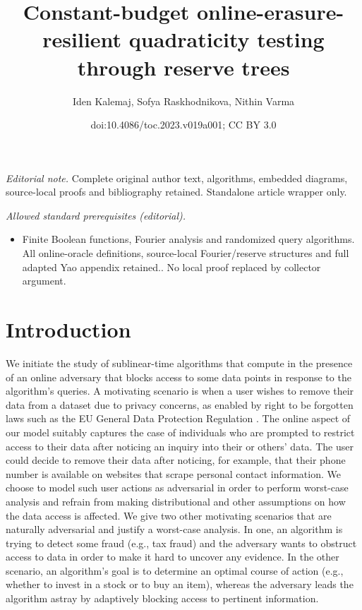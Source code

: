 \documentclass[11pt]{article}
\title{Constant-budget online-erasure-resilient quadraticity testing through reserve trees}
\author{Iden Kalemaj, Sofya Raskhodnikova, Nithin Varma}
\date{doi:10.4086/toc.2023.v019a001; CC BY 3.0}
\numberwithin{equation}{section}
\theoremstyle{definition}
\theoremstyle{plain}
\begin{document}
\maketitle
\noindent\textit{Editorial note.} Complete original author text, algorithms, embedded diagrams, source-local proofs and bibliography retained. Standalone article wrapper only.\par\medskip
\noindent\textit{Allowed standard prerequisites (editorial).}\begin{itemize}
\item Finite Boolean functions, Fourier analysis and randomized query algorithms. All online-oracle definitions, source-local Fourier/reserve structures and full adapted Yao appendix retained.. No local proof replaced by collector argument.
\end{itemize}\medskip
\section{Introduction}

	   
We initiate the study of sublinear-time algorithms that compute in the presence of an online adversary that blocks access to some data points in response to the algorithm's queries. A motivating scenario is when a user wishes to remove their data from a dataset due to privacy concerns, as enabled by right to be forgotten laws such as the EU General Data Protection Regulation \cite{Mantelero13}. 
The online aspect of our model suitably captures the case of individuals who are prompted to restrict access to their data after noticing an inquiry into their or others' data. The user could decide to remove their data after noticing, for example, that their phone number is available on websites that scrape personal contact information.
We choose to model such user actions as adversarial in order to perform worst-case analysis and refrain from making distributional and other assumptions on how the data access is affected. We give two other motivating scenarios that are naturally adversarial and justify a worst-case analysis. In one, an  algorithm is trying to detect some fraud (e.g., tax fraud) and the adversary wants to obstruct access to data in order to make it hard to uncover any evidence. In the other scenario, an algorithm's goal is to determine an optimal course of action (e.g., whether to invest in a stock or to buy an item), whereas the adversary leads the algorithm astray by adaptively blocking access to pertinent information. 
\end{document}
